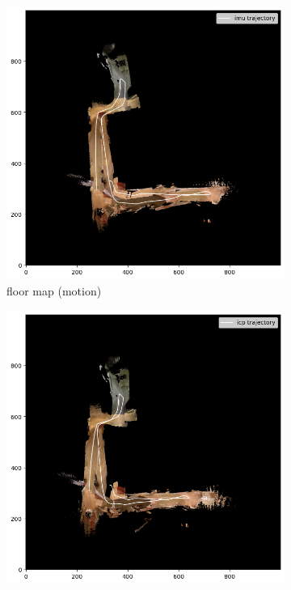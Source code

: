 \documentclass[conference]{IEEEtran}
\begin{document}
\begin{figure}
    \begin{subfigure}{0.24\textwidth}
        \includegraphics[width=\linewidth]{../img/fmap_21_imu.png}
        \caption{floor map (motion)}
        \label{fig:fmap_21_imu}
    \end{subfigure}
    \hfill
    \begin{subfigure}{0.24\textwidth}
        \includegraphics[width=\linewidth]{../img/fmap_21_icp.png}

\end{subfigure}
\end{figure}
\end{document}
